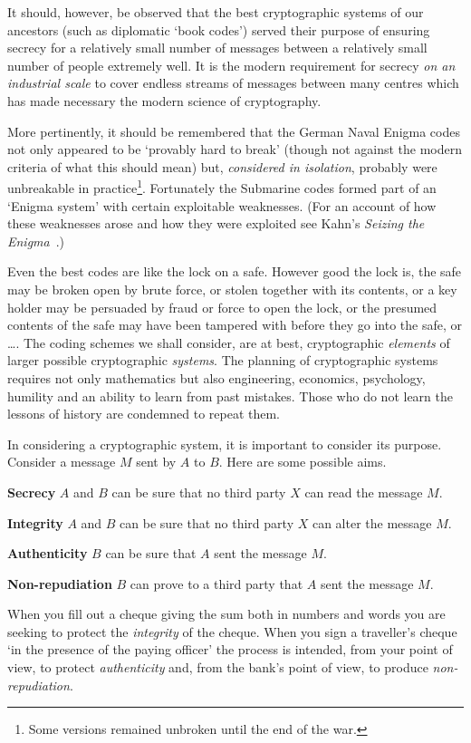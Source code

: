 \documentclass[12pt,a4paper]{article}
\theoremstyle{plain}
\theoremstyle{definition}
\begin{document}
It should, however, be observed that the
best cryptographic systems of our ancestors
(such as diplomatic `book codes') served their
purpose of ensuring secrecy for a relatively
small number of messages between a relatively
small number of people extremely well. It
is the modern requirement for secrecy
\emph{on an industrial scale} to cover
endless streams of messages between
many centres which has made necessary
the modern science of cryptography.

More pertinently, it should be remembered
that the German Naval Enigma codes
not only appeared to be `provably hard to break'
(though not against the modern criteria
of what this should mean) but, \emph{considered
in isolation}, probably were unbreakable
in practice\footnote{Some versions remained
unbroken until the end of the war.}.
Fortunately the Submarine codes formed part
of an `Enigma system' with certain
exploitable weaknesses. (For an account
of how these weaknesses arose and how they
were exploited see Kahn's \emph{Seizing
the Enigma}~\cite{Kahn Enigma}.)

Even the best codes are like the
lock on a safe. However good the lock is,
the safe may be broken open by brute force,
or stolen together with its contents,
or a key holder may be
persuaded by fraud or force to open
the lock, or the presumed
contents of the safe
may have been tampered with before they
go into the safe, or \dots.
The coding schemes we shall consider,
are at best, cryptographic \emph{elements}
of larger possible cryptographic \emph{systems}.
The planning of cryptographic systems
requires not only mathematics but also
engineering, economics, psychology,
humility
and an ability to learn from past mistakes.
Those who do not learn the lessons of history are
condemned to repeat them.

In considering a cryptographic system, it
is important to consider its purpose.
Consider a message $M$ sent by $A$ to $B$.
Here are some possible aims.

\noindent
{\bf Secrecy} $A$ and $B$ can be sure that no
third party $X$ can read the message $M$.

\noindent
{\bf Integrity} $A$ and $B$ can be sure that no
third party $X$ can alter the message $M$.

\noindent
{\bf Authenticity} $B$ can be sure that $A$
sent the message $M$.

\noindent
{\bf Non-repudiation} $B$ can prove to
a third party that $A$
sent the message $M$.

When you fill out a cheque giving the sum both
in numbers and words you are seeking to protect
the \emph{integrity} of the cheque. When you
sign a traveller's cheque `in the presence of
the paying officer' the process is intended,
from your point of view,
to protect \emph{authenticity} and, from
the bank's point of view, to produce
\emph{non-repudiation}.
\end{document}
